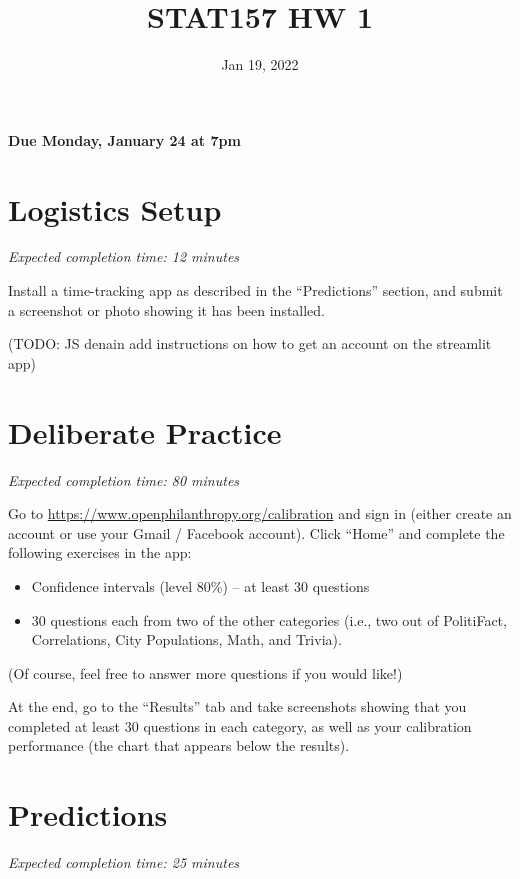 \documentclass[11pt]{article}
\title{STAT157 HW 1}
\date{Jan 19, 2022}
\begin{document}
\maketitle

\hfill \textbf{Due Monday, January 24 at 7pm}

\section*{Logistics Setup}

\emph{Expected completion time: 12 minutes}

Install a time-tracking app as described in the ``Predictions'' section, and submit a screenshot or photo showing it has been 
installed.

(TODO: JS denain add instructions on how to get an account on the streamlit app)


\section*{Deliberate Practice}

\emph{Expected completion time: 80 minutes}

Go to \url{https://www.openphilanthropy.org/calibration} and sign in (either create an account or use your 
Gmail / Facebook account). Click ``Home'' and complete the following exercises in the app:

\begin{itemize}

\item Confidence intervals (level 80\%) -- at least 30 questions
\item 30 questions each from two of the other categories (i.e., two out of PolitiFact, Correlations, City Populations, Math, and Trivia).

\end{itemize}

(Of course, feel free to answer more questions if you would like!)

At the end, go to the ``Results'' tab and take screenshots showing that 
you completed at least 30 questions in each category, as well as your calibration 
performance (the chart that appears below the results).

\section*{Predictions}

\emph{Expected completion time: 25 minutes}
\end{document}
